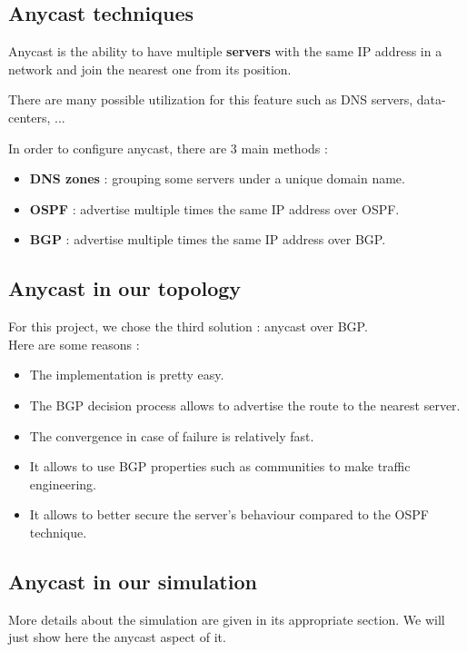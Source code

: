 \documentclass[letter, 9pt, conference]{ieeeconf}
\begin{document}
\subsection{Anycast techniques}

Anycast is the ability to have multiple \textbf{servers} with the same IP address in a network and join the nearest one from its position. 

There are many possible utilization for this feature such as DNS servers, data-centers, ... 

In order to configure anycast, there are 3 main methods : 
\begin{itemize}
    \item \textbf{DNS zones} : grouping some servers under a unique domain name. 
    \item \textbf{OSPF} : advertise multiple times the same IP address over OSPF. 
    \item \textbf{BGP} : advertise multiple times the same IP address over BGP. 
\end{itemize}

\subsection{Anycast in our topology}

For this project, we chose the third solution : anycast over BGP. \\
Here are some reasons : 
\begin{itemize}
    \item The implementation is pretty easy. 
    \item The BGP decision process allows to advertise the route to the nearest server. 
    \item The convergence in case of failure is relatively fast. 
    \item It allows to use BGP properties such as communities to make traffic engineering. 
    \item It allows to better secure the server's behaviour compared to the OSPF technique. 
\end{itemize}

\subsection{Anycast in our simulation}

More details about the simulation are given in its appropriate section. We will just show here the anycast aspect of it. 
\end{document}
